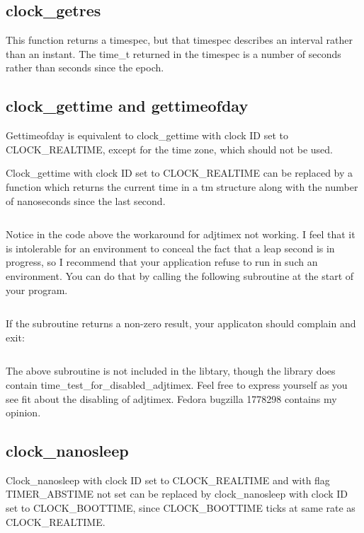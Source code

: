 \documentclass[letterpaper,twoside]{article}
\begin{document}
\subsection{clock\_getres}
This function returns a timespec, but that timespec describes an interval
rather than an instant.  The {\ttfamily time\_t} returned in the timespec is a
number of seconds rather than seconds since the epoch.

\subsection{clock\_gettime and gettimeofday}
Gettimeofday is equivalent to clock\_gettime with clock ID set to
CLOCK\_REAL\-TIME, except for the time zone, which should not be used.

Clock\_gettime with clock ID set to CLOCK\_REAL\-TIME can be replaced by
a function which returns the current time in a {\ttfamily tm} structure along
with the number of nanoseconds since the last second.
\inputminted[firstline=34]{c}{src/time_current_tm_nano.c}

Notice in the code above the workaround for {\ttfamily adjtimex}
not working.  I feel that it is intolerable for an environment to
conceal the fact that a leap second is in progress, so I recommend
that your application refuse to run in such an environment.  You
can do that by calling the following subroutine at the start
of your program.
\inputminted[firstline=36]{c}{src/time_test_for_disabled_adjtimex.c}
If the subroutine returns a non-zero result, your applicaton should
complain and exit:
\inputminted[firstline=47,lastline=67]{c}{tests/test_for_disabled_adjtimex.c}
The above subroutine is not included in the libtary, though
the library does contain
{\ttfamily time\_test\_for\_disabled\_adjtimex}.
Feel free to express yourself as you see fit about the disabling
of {\ttfamily adjtimex}.  Fedora bugzilla \num{1778298} contains my
opinion.

\subsection{clock\_nanosleep}
Clock\_nanosleep with clock ID set to CLOCK\_REAL\-TIME and with flag
TIMER\_ABS\-TIME not set can be replaced by clock\_nanosleep with
clock ID set to CLOCK\_BOOTTIME, since CLOCK\_BOOTTIME ticks at
same rate as CLOCK\_REAL\-TIME.
\end{document}
